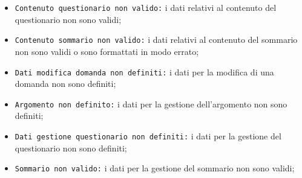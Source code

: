 \begin{itemize}
	\item \texttt{Contenuto questionario non valido:} i dati relativi al contenuto del questionario non sono validi;
	\item \texttt{Contenuto sommario non valido:} i dati relativi al contenuto del  sommario non sono validi o sono formattati in modo errato;
	\item \texttt{Dati modifica domanda non definiti:} i dati per la modifica di una domanda non sono definiti;
	\item \texttt{Argomento non definito:} i dati per la gestione dell'argomento non sono definiti;
	\item \texttt{Dati gestione questionario non definiti:} i dati per la gestione del questionario non sono definiti;
	\item \texttt{Sommario non valido:} i dati per la gestione del sommario non sono validi;
\end{itemize} 